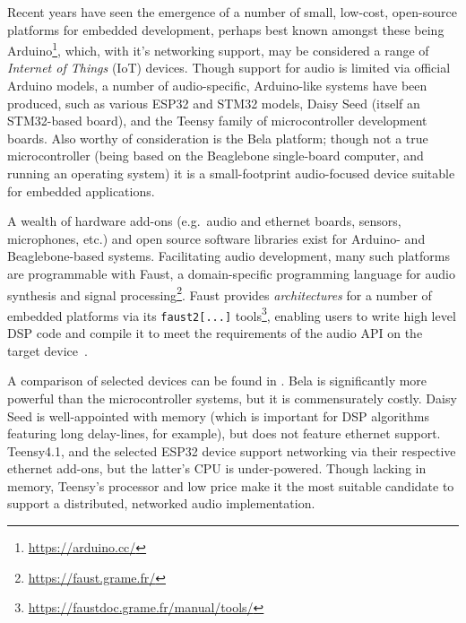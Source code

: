Recent years have seen the emergence of a number of small, low-cost, open-source
platforms for embedded development, perhaps best known amongst these being
Arduino\footnote{\url{https://arduino.cc/}}, which, with it's networking support, may be
considered a range of \textit{Internet of Things} (IoT) devices.
Though support for audio is limited via official Arduino models, a number of
audio-specific, Arduino-like systems have been produced, such as various
ESP32 and STM32 models, Daisy Seed (itself an STM32-based board), and the Teensy
family of microcontroller development boards.
Also worthy of consideration is the Bela platform; though not a true
microcontroller (being based on the Beaglebone single-board computer, and
running an operating system) it is a small-footprint audio-focused device
suitable for embedded applications.

A wealth of hardware add-ons (e.g.\ audio and ethernet boards, sensors,
microphones, etc.) and open source software libraries exist for Arduino- and
Beaglebone-based systems.
Facilitating audio development, many such platforms are programmable with
Faust, a domain-specific programming language for audio synthesis and signal
processing\footnote{\url{https://faust.grame.fr/}}.
Faust provides \textit{architectures} for a number of embedded platforms via its
\texttt{faust2[...]} tools\footnote{
    \url{https://faustdoc.grame.fr/manual/tools/}
}, enabling users to write high level DSP code and compile it to meet the
requirements of the audio API on the target device~\citep{michon_real_2019,
    michon_embedded_2020}.


A comparison of selected devices can be found in
.
Bela is significantly more powerful than the microcontroller systems, but it is
commensurately costly.
Daisy Seed is well-appointed with memory (which is important for DSP algorithms
featuring long delay-lines, for example), but does not feature ethernet support.
Teensy4.1, and the selected ESP32 device support networking via their
respective ethernet add-ons, but the latter's CPU is under-powered.
Though lacking in memory, Teensy's processor and low price make it the most
suitable candidate to support a distributed, networked audio implementation.
